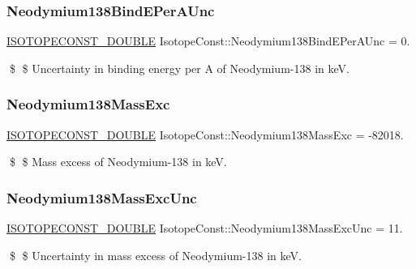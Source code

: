 \subsubsection{\texorpdfstring{Neodymium138\+Bind\+E\+Per\+A\+Unc}{Neodymium138BindEPerAUnc}}
{\footnotesize\ttfamily \mbox{\hyperlink{group___isotope_const-_macros_ga8f45a7272ce02c0b4c65c44636ed719a}{I\+S\+O\+T\+O\+P\+E\+C\+O\+N\+S\+T\+\_\+\+D\+O\+U\+B\+LE}} Isotope\+Const\+::\+Neodymium138\+Bind\+E\+Per\+A\+Unc = 0.}

\$ \$ Uncertainty in binding energy per A of Neodymium-\/138 in keV. \mbox{\label{group___isotope_const-_neodymium-_nd138_gaef00800b5f5096445c9948e85f7b1ddc}} 
\subsubsection{\texorpdfstring{Neodymium138\+Mass\+Exc}{Neodymium138MassExc}}
{\footnotesize\ttfamily \mbox{\hyperlink{group___isotope_const-_macros_ga8f45a7272ce02c0b4c65c44636ed719a}{I\+S\+O\+T\+O\+P\+E\+C\+O\+N\+S\+T\+\_\+\+D\+O\+U\+B\+LE}} Isotope\+Const\+::\+Neodymium138\+Mass\+Exc = -\/82018.}

\$ \$ Mass excess of Neodymium-\/138 in keV. \mbox{\label{group___isotope_const-_neodymium-_nd138_gaab4ca36eefae549746052fa3817d16ca}} 
\subsubsection{\texorpdfstring{Neodymium138\+Mass\+Exc\+Unc}{Neodymium138MassExcUnc}}
{\footnotesize\ttfamily \mbox{\hyperlink{group___isotope_const-_macros_ga8f45a7272ce02c0b4c65c44636ed719a}{I\+S\+O\+T\+O\+P\+E\+C\+O\+N\+S\+T\+\_\+\+D\+O\+U\+B\+LE}} Isotope\+Const\+::\+Neodymium138\+Mass\+Exc\+Unc = 11.}

\$ \$ Uncertainty in mass excess of Neodymium-\/138 in keV. \mbox{\label{group___isotope_const-_neodymium-_nd138_gaac60cf0a11778f8f27d409ef7a89de51}} 
